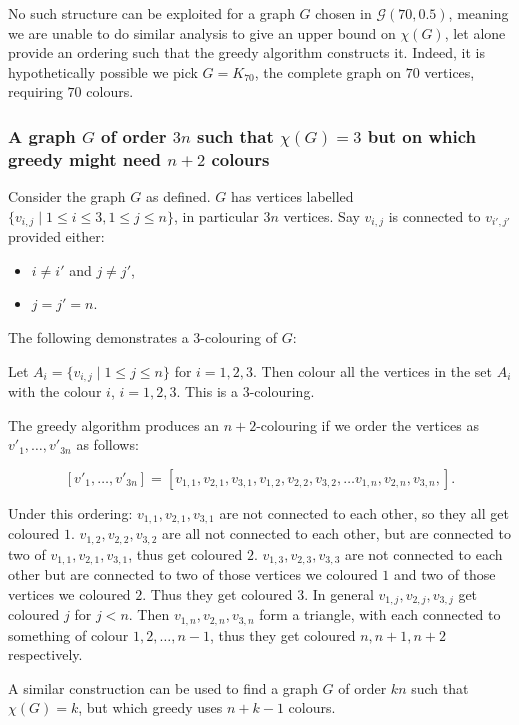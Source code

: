 \documentclass{article}
\begin{document}
No such structure can be exploited for a graph $G$ chosen in $\mathcal{G}(70, 0.5)$, meaning we are unable to do similar analysis to give an upper bound on $\chi(G)$, let alone provide an ordering such that the greedy algorithm constructs it. Indeed, it is hypothetically possible we pick $G = K_{70}$, the complete graph on $70$ vertices, requiring $70$ colours.

\subsubsection{A graph $G$ of order $3n$ such that $\chi(G) = 3$ but on which greedy might need $n + 2$ colours}

Consider the graph $G$ as defined. $G$ has vertices labelled $\{ v_{i,j} \mid 1 \leq i \leq 3, 1 \leq j \leq n\}$, in particular $3n$ vertices. Say $v_{i,j}$ is connected to $v_{i',j'}$ provided either:

\begin{itemize}
	\item $i \neq i'$ and $j \neq j'$,
	\item $j = j' = n$.
\end{itemize}

The following demonstrates a $3$-colouring of $G$:

Let $A_i = \{v_{i, j} \mid 1 \leq j \leq n \}$ for $i = 1, 2, 3$. Then colour all the vertices in the set $A_i$ with the colour $i$, $i=1,2,3$. This is a $3$-colouring.

The greedy algorithm produces an $n+2$-colouring if we order the vertices as $v'_1, \dots, v'_{3n}$ as follows:

$$[v'_1, \dots, v'_{3n}] = [v_{1,1}, v_{2,1}, v_{3,1}, v_{1,2}, v_{2,2}, v_{3,2}, \dots v_{1,n}, v_{2,n}, v_{3,n},].$$

Under this ordering: $v_{1,1}, v_{2,1}, v_{3,1}$ are not connected to each other, so they all get coloured $1$. $v_{1,2}, v_{2,2}, v_{3,2}$ are all not connected to each other, but are connected to two of $v_{1,1}, v_{2,1}, v_{3,1}$, thus get coloured $2$. $v_{1,3}, v_{2,3}, v_{3,3}$ are not connected to each other but are connected to two of those vertices we coloured $1$ and two of those vertices we coloured $2$. Thus they get coloured $3$. In general $v_{1,j}, v_{2,j}, v_{3,j}$ get coloured $j$ for $j<n$. Then $v_{1,n}, v_{2,n}, v_{3,n}$ form a triangle, with each connected to something of colour $1, 2, \dots, n-1$, thus they get coloured $n, n+1, n+2$ respectively.

A similar construction can be used to find a graph $G$ of order $kn$ such that $\chi(G) = k$, but which greedy uses $n+k-1$ colours.
\end{document}
